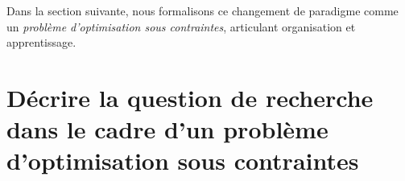 \documentclass[ twoside,openright,titlepage,numbers=noenddot,headinclude,%
                footinclude=true,cleardoublepage=empty,abstractoff, %
                BCOR=5mm,paper=a4,fontsize=11pt,%
                french,american,%
                ]{scrreprt}
\begin{document}
Dans la section suivante, nous formalisons ce changement de paradigme comme un \textit{problème d'optimisation sous contraintes}, articulant organisation et apprentissage.


\section{Décrire la question de recherche dans le cadre d'un problème d'optimisation sous contraintes}\label{sec:constrained-formulation}

\end{document}
